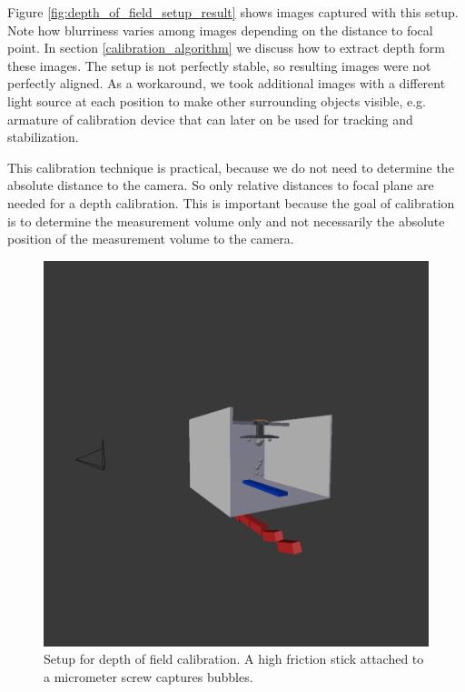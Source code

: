 			Figure \ref{fig:depth_of_field_setup_result} shows images captured with this setup. Note how blurriness varies among images depending on the distance to focal point. In section \ref{calibration_algorithm} we discuss how to extract depth form these images. The setup is not perfectly stable, so resulting images were not perfectly aligned. As a workaround, we took additional images with a different light source at each position to make other surrounding objects visible, e.g. armature of calibration device that can later on be used for tracking and stabilization. 
			
			This calibration technique is practical, because we do not need to determine the absolute distance to the camera. So only relative distances to focal plane are needed for a depth calibration. This is important because the goal of calibration is to determine the measurement volume only and not necessarily the absolute position of the measurement volume to the camera. 
			
			
			\begin{figure}
				\centering
				\includegraphics[scale=.2]{images/depth_of_field_setup.png}
				\caption{Setup for depth of field calibration. A high friction stick attached to a micrometer screw captures bubbles. }
				\label{fig:depth_of_field_setup}
			\end{figure}
			
